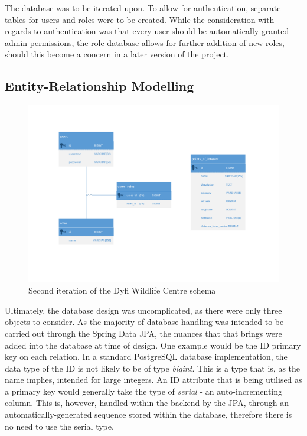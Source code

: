 The database was to be iterated upon. To allow for authentication, separate tables for users and roles were to be created. While the consideration with regards to authentication was that every user should be automatically granted admin permissions, the role database allows for further addition of new roles, should this become a concern in a later version of the project.

\subsection{Entity-Relationship Modelling}
\begin{figure}[H]
	\caption{Second iteration of the Dyfi Wildlife Centre schema}
	\includegraphics[scale=0.6]{diagrams/er_diagram}
\end{figure}	

Ultimately, the database design was uncomplicated, as there were only three objects to consider. As the majority of database handling was intended to be carried out through the Spring Data JPA, the nuances that that brings were added into the database at time of design. One example would be the ID primary key on each relation. In a standard PostgreSQL database implementation, the data type of the ID is not likely to be of type \textit{bigint}. This is a type that is, as the name implies, intended for large integers. An ID attribute that is being utilised as a primary key would generally take the type of \textit{serial} - an auto-incrementing column. This is, however, handled within the backend by the JPA, through an automatically-generated sequence stored within the database, therefore there is no need to use the serial type.

